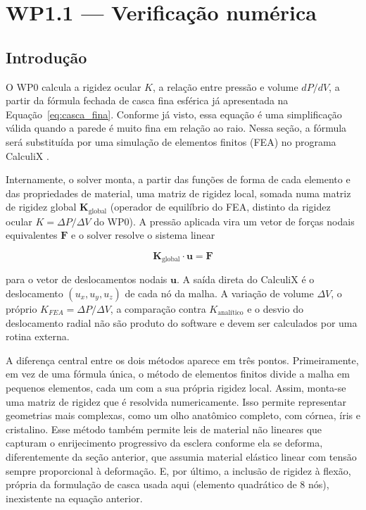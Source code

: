 \section{WP1.1 --- Verificação numérica}
 
\subsection{Introdução}
 
O WP0 calcula a rigidez ocular $K$, a relação entre pressão e volume $dP/dV$, a partir da fórmula fechada de casca fina esférica já apresentada na Equação~\ref{eq:casca_fina}. Conforme já visto, essa equação é uma simplificação válida quando a parede é muito fina em relação ao raio. Nessa seção, a fórmula será substituída por uma simulação de elementos finitos (FEA) no programa CalculiX \citep{dhondt2004finite}.
 
Internamente, o solver monta, a partir das funções de forma de cada elemento e das propriedades de material, uma matriz de rigidez local, somada numa matriz de rigidez global $\mathbf{K}_{\text{global}}$ (operador de equilíbrio do FEA, distinto da rigidez ocular $K=\Delta P/\Delta V$ do WP0). A pressão aplicada vira um vetor de forças nodais equivalentes $\mathbf{F}$ e o solver resolve o sistema linear \citep{bathe1996}
 
\begin{equation}
\mathbf{K}_{\text{global}}\cdot\mathbf{u}=\mathbf{F}
\label{eq:sistema_fea}
\end{equation}
 
para o vetor de deslocamentos nodais $\mathbf{u}$. A saída direta do CalculiX é o deslocamento $(u_x,u_y,u_z)$ de cada nó da malha. A variação de volume $\Delta V$, o próprio $K_{FEA}=\Delta P/\Delta V$, a comparação contra $K_{\text{analítico}}$ e o desvio do deslocamento radial não são produto do software e devem ser calculados por uma rotina externa.
 
A diferença central entre os dois métodos aparece em três pontos. Primeiramente, em vez de uma fórmula única, o método de elementos finitos divide a malha em pequenos elementos, cada um com a sua própria rigidez local. Assim, monta-se uma matriz de rigidez que é resolvida numericamente. Isso permite representar geometrias mais complexas, como um olho anatômico completo, com córnea, íris e cristalino. Esse método também permite leis de material não lineares que capturam o enrijecimento progressivo da esclera conforme ela se deforma, diferentemente da seção anterior, que assumia material elástico linear com tensão sempre proporcional à deformação. E, por último, a inclusão de rigidez à flexão, própria da formulação de casca usada aqui (elemento quadrático de 8 nós), inexistente na equação anterior.
 
